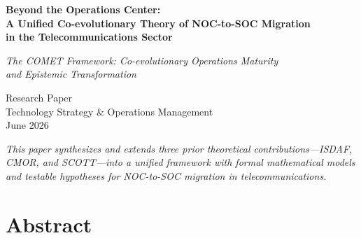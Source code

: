 \documentclass[12pt,a4paper]{article}
\begin{document}
\begin{center}
\vspace*{2cm}

{\LARGE\bfseries Beyond the Operations Center:\\[0.5cm]
A Unified Co-evolutionary Theory of NOC-to-SOC Migration\\in the Telecommunications Sector}

\vspace{1.5cm}

{\large\itshape The COMET Framework: Co-evolutionary Operations Maturity\\and Epistemic Transformation}

\vspace{2cm}

{\normalsize Research Paper\\[0.3cm]
Technology Strategy \& Operations Management\\[0.3cm]
June 2026}

\vspace{3cm}

{\small\textit{This paper synthesizes and extends three prior theoretical contributions---ISDAF, CMOR, and SCOTT---into a unified framework with formal mathematical models and testable hypotheses for NOC-to-SOC migration in telecommunications.}}

\end{center}

\newpage

\tableofcontents
\newpage

\section{Abstract}
\end{document}

